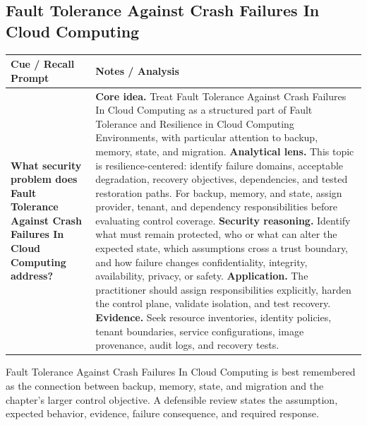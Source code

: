 \documentclass[11pt]{article}
\newcommand{\CornellHeader}{%
\rowcolor{Navy}\color{white}\bfseries Cue / Recall Prompt & \color{white}\bfseries Notes / Analysis\\\hline}
\newcommand{\CornellRow}[2]{%
\cellcolor{CueGray}\RaggedRight\textbf{#1} & \RaggedRight #2\\\hline}
\begin{document}
\subsection*{Fault Tolerance Against Crash Failures In Cloud Computing}
\begin{longtable}{>{\RaggedRight\arraybackslash}p{}|>{\RaggedRight\arraybackslash}p{}}
\CornellHeader
\CornellRow{What security problem does Fault Tolerance Against Crash Failures In Cloud Computing address?}{\textbf{Core idea.} Treat Fault Tolerance Against Crash Failures In Cloud Computing as a structured part of Fault Tolerance and Resilience in Cloud Computing Environments, with particular attention to backup, memory, state, and migration. \textbf{Analytical lens.} This topic is resilience-centered: identify failure domains, acceptable degradation, recovery objectives, dependencies, and tested restoration paths. For backup, memory, and state, assign provider, tenant, and dependency responsibilities before evaluating control coverage. \textbf{Security reasoning.} Identify what must remain protected, who or what can alter the expected state, which assumptions cross a trust boundary, and how failure changes confidentiality, integrity, availability, privacy, or safety. \textbf{Application.} The practitioner should assign responsibilities explicitly, harden the control plane, validate isolation, and test recovery. \textbf{Evidence.} Seek resource inventories, identity policies, tenant boundaries, service configurations, image provenance, audit logs, and recovery tests.}
\end{longtable}
\begin{topicsummary}
Fault Tolerance Against Crash Failures In Cloud Computing is best remembered as the connection between backup, memory, state, and migration and the chapter's larger control objective. A defensible review states the assumption, expected behavior, evidence, failure consequence, and required response.
\end{topicsummary}
\end{document}
